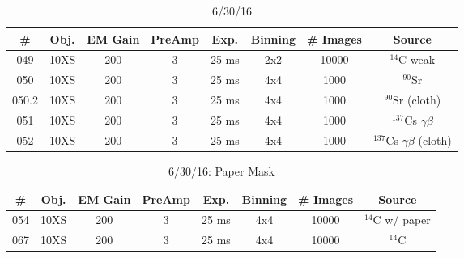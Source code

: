 \documentclass[12pt]{amsart}
\begin{document}
\begin{table}[!htbp]
	\centering
	\caption{6/30/16}
	\label{tab:table8}
	\hspace*{-1cm}
	\begin{tabular}{cccccccc}
		\toprule
		\# & Obj. & EM Gain & PreAmp & Exp. & Binning & \# Images & Source\\
		\midrule
		049 & 10XS & 200 & 3 & 25 ms & 2x2 & 10000 & $^{14}$C weak\\
		050 & 10XS & 200 & 3 & 25 ms & 4x4 & 1000 & $^{90}$Sr\\
		050.2 & 10XS & 200 & 3 & 25 ms & 4x4 & 1000 & $^{90}$Sr (cloth)\\
		051 & 10XS & 200 & 3 & 25 ms & 4x4 & 1000 & $^{137}$Cs $\gamma \beta$\\
		052 & 10XS & 200 & 3 & 25 ms & 4x4 & 1000 & $^{137}$Cs $\gamma \beta$ (cloth)\\
		\bottomrule
	\end{tabular}
	\hspace*{-1cm}
\end{table}

\begin{table}[!htbp]
	\centering
	\caption{6/30/16: Paper Mask}
	\label{tab:table9}
	\hspace*{-1cm}
	\begin{tabular}{cccccccc}
		\toprule
		\# & Obj. & EM Gain & PreAmp & Exp. & Binning & \# Images & Source\\
		\midrule
		054 & 10XS & 200 & 3 & 25 ms & 4x4 & 10000 & $^{14}$C w/ paper\\
		067 & 10XS & 200 & 3 & 25 ms & 4x4 & 10000 & $^{14}$C\\
		\bottomrule
	\end{tabular}
	\hspace*{-1cm}
\end{table}
\end{document}
